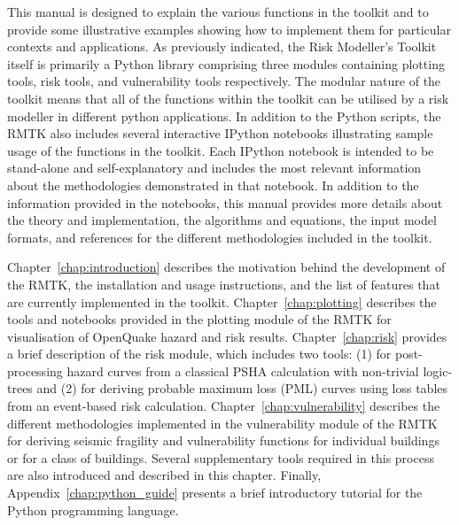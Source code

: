This manual is designed to explain the various functions in the toolkit and to provide some illustrative examples showing how to implement them for particular contexts and applications. As previously indicated, the Risk Modeller’s Toolkit itself is primarily a Python library comprising three modules containing plotting tools, risk tools, and vulnerability tools respectively. The modular nature of the toolkit means that all of the functions within the toolkit can be utilised by a risk modeller in different python applications. In addition to the Python scripts, the RMTK also includes several interactive IPython notebooks illustrating sample usage of the functions in the toolkit. Each IPython notebook is intended to be stand-alone and self-explanatory and includes the most relevant information about the methodologies demonstrated in that notebook. In addition to the information provided in the notebooks, this manual provides more details about the theory and implementation, the algorithms and equations, the input model formats, and references for the different methodologies included in the toolkit.

Chapter~\ref{chap:introduction} describes the motivation behind the development of the RMTK, the installation and usage instructions, and the list of features that are currently implemented in the toolkit. Chapter~\ref{chap:plotting} describes the tools and notebooks provided in the plotting module of the RMTK for visualisation of OpenQuake hazard and risk results. Chapter~\ref{chap:risk} provides a brief description of the risk module, which includes two tools: (1) for post-processing hazard curves from a classical PSHA calculation with non-trivial logic-trees and (2) for deriving probable maximum loss (PML) curves using loss tables from an event-based risk calculation. Chapter~\ref{chap:vulnerability} describes the different methodologies implemented in the vulnerability module of the RMTK for deriving seismic fragility and vulnerability functions for individual buildings or for a class of buildings. Several supplementary tools required in this process are also introduced and described in this chapter. Finally, Appendix~\ref{chap:python_guide} presents a brief introductory tutorial for the Python programming language.